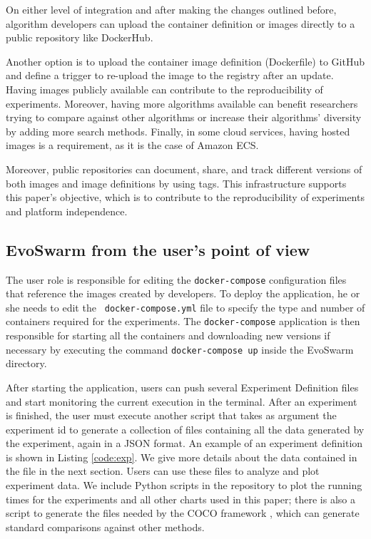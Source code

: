 \documentclass[review]{elsarticle}
\begin{document}
On either level of integration and after making the changes outlined before,
algorithm developers can upload the container 
definition or images directly to a public repository like DockerHub. 

Another option is to upload the container image definition (Dockerfile) to GitHub and
define a trigger to re-upload the image to the registry after an update. Having
images publicly available can contribute to the reproducibility of experiments.
Moreover, having more algorithms available can benefit researchers trying to
compare against other algorithms or increase their algorithms' diversity by 
adding more search methods. Finally, in some cloud services, having hosted
images is a requirement, as it is the case of Amazon ECS.

Moreover, public repositories can document, share, 
and track different versions of both images and image definitions by using
tags. This infrastructure supports this paper's objective, which is to
contribute to the reproducibility of experiments and platform independence.

\subsection{EvoSwarm from the user's point of view} 
\label{sec:evoswarm:config}

The user role is responsible for
editing the {\tt docker-compose} configuration files that reference the images created
by developers. To deploy the application, he or she needs to edit the {\tt
docker-compose.yml} file to specify the type and number of containers required
for the experiments. The {\tt docker-compose} application is then responsible for
starting all the containers and downloading new versions if necessary
by executing the command {\tt docker-compose up}  inside the EvoSwarm directory.

After starting the application, users can push several Experiment Definition
files and start monitoring the current execution in the terminal.
After an experiment is finished, the user must execute another script
that takes as argument the experiment id to generate a collection of files containing all the
data generated by the experiment, again in a JSON format. An example of an
experiment definition is shown in Listing \ref{code:exp}. We give more details about the
data contained in the file in the next section. Users can use these files
to analyze and plot experiment data. We include Python
scripts  in the repository to plot the running times for the
experiments and all other charts used in this paper;  there is also a script to
generate the files needed by the COCO framework \cite{hansen2016coco}, which can generate standard
comparisons against other methods.
\end{document}
